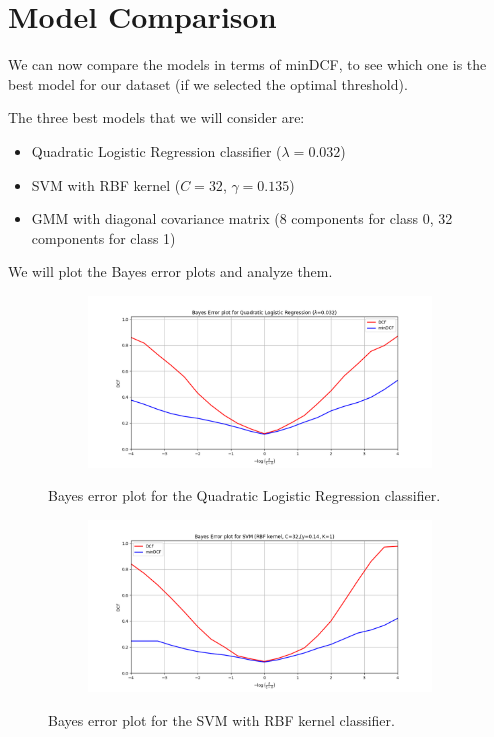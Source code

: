 \documentclass[12pt]{report}
\newcommand{\nl}{%
    \newline
    \noindent
}
\begin{document}
\section{Model Comparison}
We can now compare the models in terms of minDCF, to see which one is the best model for our dataset (if we selected the optimal threshold).
\nl
The three best models that we will consider are:
\begin{itemize}
    \item Quadratic Logistic Regression classifier ($\lambda = 0.032$)
    \item SVM with RBF kernel ($C=32$, $\gamma=0.135$)
    \item GMM with diagonal covariance matrix (8 components for class 0, 32 components for class 1)
\end{itemize}
We will plot the Bayes error plots and analyze them.

\begin{figure}[H]
    \centering
    \begin{subfigure}[t]{0.6\textwidth}
        \includegraphics[width=\textwidth]{./plot/model_selection/LogisticRegression.png}
    \end{subfigure}
    \caption{Bayes error plot for the Quadratic Logistic Regression classifier.}
    \label{fig:bayes_error_LR}
\end{figure}

\begin{figure}[H]
    \centering
    \begin{subfigure}[t]{0.6\textwidth}
        \includegraphics[width=\textwidth]{./plot/model_selection/kernelSVM.png}
    \end{subfigure}
    \caption{Bayes error plot for the SVM with RBF kernel classifier.}
    \label{fig:bayes_error_SVM}
\end{figure}
\end{document}
